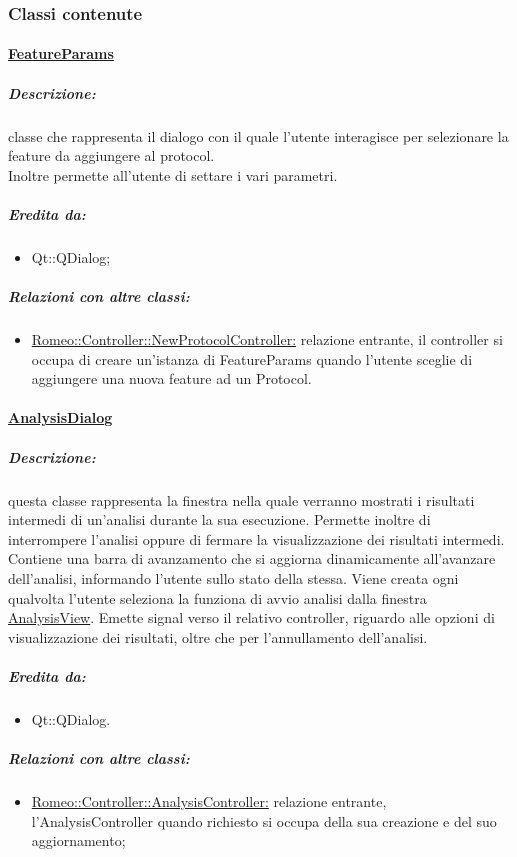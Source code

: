 		\subsubsection{Classi contenute}

		\paragraph{\underline{FeatureParams}}
		\label{featureparams}
			\subparagraph{Descrizione:} classe che rappresenta il dialogo con il quale l'utente interagisce per selezionare la feature\g{} da aggiungere al protocol\g{}.
			\\Inoltre permette all'utente di settare i vari parametri.
			\subparagraph{Eredita da:}
				\begin{itemize}
					\item Qt::QDialog;
				\end{itemize}
			\subparagraph{Relazioni con altre classi:}
				\begin{itemize}
					\item \hyperref[]{Romeo::Controller::NewProtocolController:} relazione entrante, il controller si occupa di creare un'istanza di FeatureParams quando l'utente sceglie di aggiungere una nuova feature\g{} ad un Protocol\g{}.
				\end{itemize}
				
		\paragraph{\underline{AnalysisDialog}}
		\label{eav}
			\subparagraph{Descrizione:} questa classe rappresenta la finestra nella quale verranno mostrati i risultati intermedi di un'analisi durante la sua esecuzione. Permette inoltre di interrompere l'analisi oppure di fermare la visualizzazione dei risultati intermedi. Contiene una barra di avanzamento che si aggiorna dinamicamente all'avanzare dell'analisi, informando l'utente sullo stato della stessa.
			Viene creata ogni qualvolta l'utente seleziona la funziona di avvio analisi dalla finestra \hyperref[sav]{AnalysisView}. Emette signal\g{} verso il relativo controller, riguardo alle opzioni di visualizzazione dei risultati, oltre che per l'annullamento dell'analisi.
			\subparagraph{Eredita da:}
				\begin{itemize}
				\item Qt::QDialog.
				\end{itemize}
			\subparagraph{Relazioni con altre classi:}
				\begin{itemize}
					\item \hyperref[controller_sa]{Romeo::Controller::AnalysisController:} relazione entrante, l'AnalysisController quando richiesto si occupa della sua creazione e del suo aggiornamento;
				\end{itemize}
				
